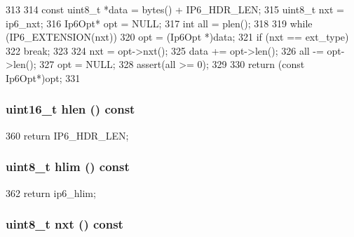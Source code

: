 \begin{DoxyCode}
313 {
314     const uint8_t *data = bytes() + IP6_HDR_LEN;
315     uint8_t nxt = ip6_nxt;
316     Ip6Opt* opt = NULL;
317     int all = plen();
318 
319     while (IP6_EXTENSION(nxt)) {
320         opt = (Ip6Opt *)data;
321         if (nxt == ext_type) {
322             break;
323         }
324         nxt = opt->nxt();
325         data += opt->len();
326         all -= opt->len();
327         opt = NULL;
328         assert(all >= 0);
329     }
330     return (const Ip6Opt*)opt;
331 }
\end{DoxyCode}
\hypertarget{structNet_1_1Ip6Hdr_a99ca1c2b90035435849dd875b138bdad}{
\subsubsection[{hlen}]{\setlength{\rightskip}{0pt plus 5cm}uint16\_\-t hlen () const}}
\label{structNet_1_1Ip6Hdr_a99ca1c2b90035435849dd875b138bdad}



\begin{DoxyCode}
360 { return IP6_HDR_LEN; }
\end{DoxyCode}
\hypertarget{structNet_1_1Ip6Hdr_a12dbfe3b5265507c192dfb7654aed123}{
\subsubsection[{hlim}]{\setlength{\rightskip}{0pt plus 5cm}uint8\_\-t hlim () const}}
\label{structNet_1_1Ip6Hdr_a12dbfe3b5265507c192dfb7654aed123}



\begin{DoxyCode}
362 { return ip6_hlim; }
\end{DoxyCode}
\hypertarget{structNet_1_1Ip6Hdr_aa9a773e8c63669710e2900218d27c6ef}{
\subsubsection[{nxt}]{\setlength{\rightskip}{0pt plus 5cm}uint8\_\-t nxt () const}}
\label{structNet_1_1Ip6Hdr_aa9a773e8c63669710e2900218d27c6ef}



